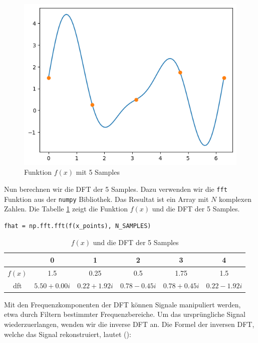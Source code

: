 \documentclass[11pt,a4paper]{article}
\begin{document}
\begin{figure}[h]
	\centering
	\includegraphics[width=0.60\linewidth]{img/dft.png}
	\caption{Funktion \( f(x) \) mit 5 Samples}
	\label{fig:dft_example}
\end{figure}

\noindent
Nun berechnen wir die DFT der 5 Samples. Dazu verwenden wir die \texttt{fft} Funktion aus der
\texttt{numpy} Bibliothek. Das Resultat ist ein Array mit \(N\) komplexen Zahlen. Die Tabelle
\ref{tab:dft_example_table} zeigt die Funktion \(f(x)\) und die DFT der 5 Samples.

\begin{lstlisting}
fhat = np.fft.fft(f(x_points), N_SAMPLES)
\end{lstlisting}

\begin{table}[h]
	\centering
	\begin{tabular}{|c|c|c|c|c|c|}
		\hline
		         & 0                & 1                & 2                & 3                & 4                \\
		\hline
		\(f(x)\) & 1.5              & 0.25             & 0.5              & 1.75             & 1.5              \\
		\hline
		dft      & \(5.50 + 0.00i\) & \(0.22 + 1.92i\) & \(0.78 - 0.45i\) & \(0.78 + 0.45i\) & \(0.22 - 1.92i\) \\
		\hline
	\end{tabular}
	\caption{\(f(x)\) und die DFT der 5 Samples}
	\label{tab:dft_example_table}
\end{table}

\noindent
Mit den Frequenzkomponenten der DFT können Signale manipuliert werden, etwa durch Filtern
bestimmter Frequenzbereiche. Um das ursprüngliche Signal wiederzuerlangen, wenden wir die inverse
DFT an. Die Formel der inversen DFT, welche das Signal rekonstruiert, lautet
(\cite[Chapter~3]{hansen2014fourier}):
\end{document}

